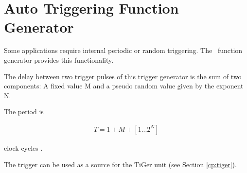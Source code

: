 
\section{Auto Triggering Function Generator\label{cp:AutoTriggeringFunctionGenerator}}
Some applications require internal periodic or random triggering. The \deviceName\ function generator provides this functionality.\par

The delay between two trigger pulses of this trigger generator is the sum of two components: A fixed value M and a pseudo random value given by the exponent N. \par

The period is

\begin{align}
    T = 1 + M + [1...2^N]
\end{align}

clock cycles .\par

The trigger can be used as a source for the TiGer unit (see Section \ref{cp:tiger}).


